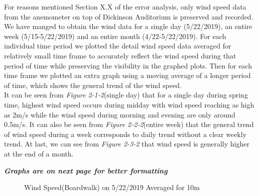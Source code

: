 \documentclass[review]{elsarticle}
\begin{document}
\clearpage

For reasons mentioned Section X.X of the error analysis, only wind speed data from the anemometer on top of Dickinson Auditorium is preserved and recorded. We have manged to obtain 
the wind data for a single day (5/22/2019), an entire week (5/15-5/22/2019) and an entire month (4/22-5/22/2019). For each individual time period we plotted the detail wind speed data 
averaged for relatively small time frame to accurately reflect the wind speed during that period of time while preserving the visibility in the graphed plots. Then for each time frame 
we plotted an extra graph using a moving average of a longer period of time, which shows the general trend of the wind speed.
\\\indent It can be seen from \textit{Figure 2-1-2}(single day) that for a single day during spring time, highest wind speed occurs during midday with wind speed reaching as high as 2m/s while the wind 
speed during morning and evening are only around 0.5m/s. It can also be seen from \textit{Figure 2-2-2}(entire week) that the general trend of wind speed during a week corresponds to daily trend without 
a clear weekly trend. At last, we can see from \textit{Figure 2-3-2} that wind speed is generally higher at the end of a month.

\textit{\textbf{Graphs are on next page for better formatting}}
\clearpage


\begin{figure}
    \caption{Wind Speed(Boardwalk) on 5/22/2019 Averaged for 10m}
    \label{wind:oneday:tenminutes}
\end{figure}
\end{document}
